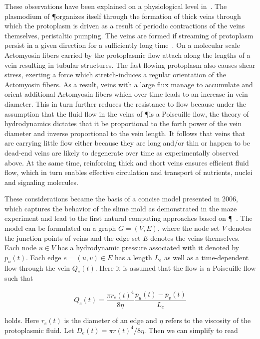 	These observations have been explained on a physiological level in~\cite{Tero2006115}. The plasmodium of \P organizes itself through the formation of thick veins through which the protoplasm is driven as a result of periodic contractions of the veins themselves, \ie peristaltic pumping. The veins are formed if streaming of protoplasm persist in a given direction for a sufficiently long time~\cite{nakagaki2000interaction}. On a molecular scale Actomyosin fibers carried by the protoplasmic flow attach along the lengths of a vein resulting in tubular structures. The fast flowing protoplasm also causes shear stress, exerting a force which stretch-induces a regular orientation of the Actomyosin fibers. As a result, veins with a large flux manage to accumulate and orient additional Actomyosin fibers which over time leads to an increase in vein diameter. This in turn further reduces the resistance to flow because under the assumption that the fluid flow in the veins of \P is a Poiseuille flow, the theory of hydrodynamics dictates that it be proportional to the forth power of the vein diameter and inverse proportional to the vein length. It follows that veins that are carrying little flow either because they are long and/or thin or happen to be dead-end veins are likely to degenerate over time as experimentally observed above. At the same time, reinforcing thick and short veins ensures efficient fluid flow, which in turn enables effective circulation and transport of nutrients, nuclei and signaling molecules.

	These considerations became the basis of a concise model presented in 2006, which captures the behavior of the slime mold as demonstrated in the maze experiment and lead to the first natural computing approaches based on \P~\cite{Tero2006115}. The model can be formulated on a graph $G = (V,E)$, where the node set $V$ denotes the junction points of veins and the edge set $E$ denotes the veins themselves. Each node $u \in V$ has a hydrodynamic pressure associated with it denoted by $p_u(t)$. Each edge $e = (u,v) \in E$ has a length $L_e$ as well as a time-dependent flow through the vein $Q_e(t)$. Here it is assumed that the flow is a Poiseuille flow such that

	\begin{equation}
		Q_e(t) = \frac{\pi r_e(t)^4}{ 8 \eta} \frac{p_u(t)-p_v(t)}{L_e}
		\label{eq:flow_initial}
	\end{equation}
	
	holds. Here $r_e(t)$ is the diameter of an edge and $\eta$ refers to the viscosity of the protoplasmic fluid. Let $D_e(t) = \pi r(t)^4/ 8 \eta$. Then we can simplify  to read

